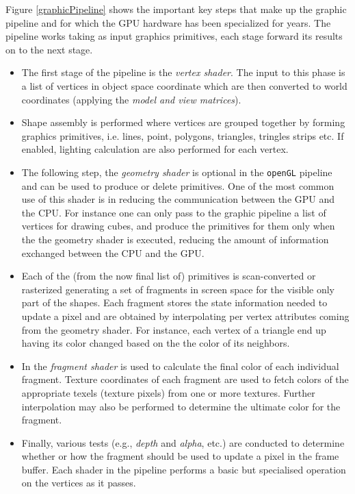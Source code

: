 \begin{description}
     Figure \ref{graphicPipeline} shows the important key steps that make up the graphic pipeline and for which the GPU hardware has been specialized for years. The pipeline works taking as input graphics primitives, each stage forward its results on to the next stage.
    \begin{itemize}
    	\item     The first stage of the pipeline is the \textit{vertex shader}. The
    	input to this phase is a list of vertices in object space coordinate which are then converted to world coordinates (applying the \textit{model and view matrices}).
    	\item  Shape assembly is performed where vertices are grouped together by forming graphics primitives, i.e. lines, point, polygons, triangles, tringles strips etc. If enabled, lighting calculation are also performed for each vertex.
    	\item   The following step, the \textit{geometry shader} is optional in the \texttt{openGL} pipeline and can be used to produce or delete primitives. One of the most common use of this shader is in reducing the communication between the GPU and the CPU. For instance one can only pass to the graphic pipeline a list of vertices for drawing cubes, and produce the primitives for them only when the the geometry shader is executed, reducing the amount of information exchanged between the CPU and the GPU.
    	\item   Each of the (from the now final list of) primitives is scan-converted or rasterized generating a set of fragments in screen space for the visible only part of the shapes. Each fragment stores the state information needed to update a pixel and are obtained by interpolating per vertex attributes coming from the geometry shader. For instance, each vertex of a triangle end up having its color changed based on the the color of its neighbors. 
    	\item  In the \textit{fragment  shader} is used to calculate the final color of each individual fragment. Texture coordinates of each fragment are used to fetch colors of the appropriate texels (texture pixels) from
    	one or more textures. Further interpolation may also be
    	performed to determine the ultimate color for the fragment.
    	\item Finally, various tests (e.g., \textit{depth} and \textit{alpha}, etc.) are conducted to determine whether or how the fragment should be used to update a pixel in the frame buffer.    
    	Each shader in the pipeline performs a basic but specialised operation on the
    	vertices as it passes. 
    \end{itemize}


\end{description}

